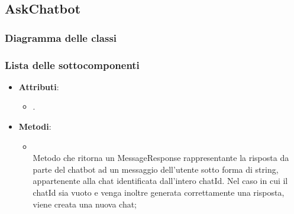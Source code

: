 \documentclass[10pt, a4paper]{article}
\begin{document}
\subsection{AskChatbot}
\subsubsection{Diagramma delle classi}
\subsubsection{Lista delle sottocomponenti}

\label{AskChatbotControllerDettaglio}
\begin{itemize}
    \item \textbf{Attributi}:
    \begin{itemize}
        \item {}.
    \end{itemize}
    \item \textbf{Metodi}:
    \begin{itemize}
        \item {}\\
        Metodo che ritorna un MessageResponse rappresentante la risposta da parte del chatbot ad un messaggio dell'utente sotto forma di string, appartenente alla chat identificata dall'intero chatId. Nel caso in cui il chatId sia vuoto e venga inoltre generata correttamente una risposta, viene creata una nuova chat;
        
    \end{itemize}
\end{itemize}
\end{document}
